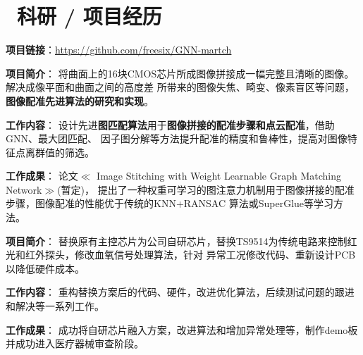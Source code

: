 \documentclass{resume}
\begin{document}
\section{\textcolor[RGB]{50,50,190}{\faUsers\ 科研 / 项目经历}}


\textcolor[RGB]{80,100,190}{\textbf{项目链接}}：\hyperlink{https://github.com/freesix/GNN-martch}
{https://github.com/freesix/GNN-martch}

\textcolor[RGB]{80,100,190}{\textbf{项目简介}}：
将曲面上的16块CMOS芯片所成图像拼接成一幅完整且清晰的图像。解决成像平面和曲面之间的高度差
所带来的图像失焦、畸变、像素盲区等问题，\textbf{图像配准先进算法的研究和实现}。

\textcolor[RGB]{80,100,190}{\textbf{工作内容}}：
设计先进\textbf{图匹配算法}用于\textbf{图像拼接的配准步骤和点云配准}，借助GNN、最大团匹配、
因子图分解等方法提升配准的精度和鲁棒性，提高对图像特征点离群值的筛选。

\textcolor[RGB]{80,100,190}{\textbf{工作成果}}：
论文$\ll$ Image Stitching with Weight Learnable Graph Matching Network$\gg$(暂定)，
提出了一种权重可学习的图注意力机制用于图像拼接的配准步骤，图像配准的性能优于传统的KNN+RANSAC
算法或SuperGlue等学习方法。

\textcolor[RGB]{80,100,190}{\textbf{项目简介}}：
替换原有主控芯片为公司自研芯片，替换TS9514为传统电路来控制红光和红外探头，修改血氧信号处理算法，针对
异常工况修改代码、重新设计PCB以降低硬件成本。

\textcolor[RGB]{80,100,190}{\textbf{工作内容}}：
重构替换方案后的代码、硬件，改进优化算法，后续测试问题的跟进和解决等一系列工作。

\textcolor[RGB]{80,100,190}{\textbf{工作成果}}：
成功将自研芯片融入方案，改进算法和增加异常处理等，制作demo板并成功进入医疗器械审查阶段。
\end{document}
